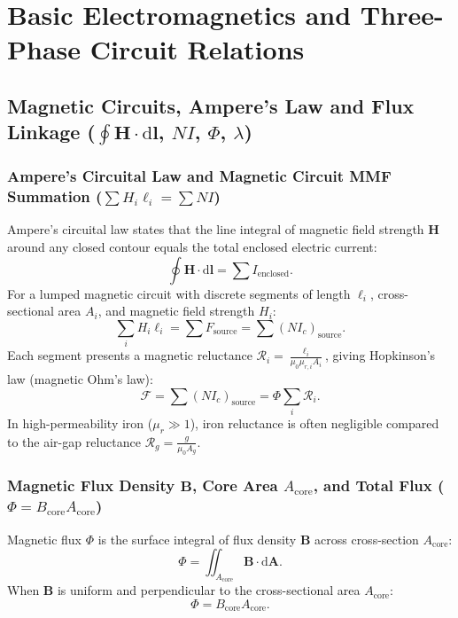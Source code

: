 \section{Basic Electromagnetics and Three-Phase Circuit Relations}

\subsection{Magnetic Circuits, Ampere's Law and Flux Linkage ($\oint \mathbf{H}\cdot\mathrm{d}\mathbf{l}$, $N I$, $\Phi$, $\lambda$)}

\subsubsection{Ampere's Circuital Law and Magnetic Circuit MMF Summation ($\sum H_i \ell_i = \sum N I$)}
Ampere's circuital law states that the line integral of magnetic field strength $\mathbf{H}$ around any closed contour equals the total enclosed electric current:
\[
\oint \mathbf{H}\cdot\mathrm{d}\mathbf{l} = \sum I_{\mathrm{enclosed}}.
\]
For a lumped magnetic circuit with discrete segments of length $\ell_i$, cross-sectional area $A_i$, and magnetic field strength $H_i$:
\[
\sum_i H_i\ell_i = \sum F_{\mathrm{source}} = \sum (N I_c)_{\mathrm{source}}.
\]
Each segment presents a magnetic reluctance $\mathcal{R}_i = \frac{\ell_i}{\mu_0 \mu_{r,i} A_i}$, giving Hopkinson's law (magnetic Ohm's law):
\[
\mathcal{F} = \sum (N I_c)_{\mathrm{source}} = \Phi \sum_i \mathcal{R}_i.
\]
In high-permeability iron ($\mu_r \gg 1$), iron reluctance is often negligible compared to the air-gap reluctance $\mathcal{R}_g = \frac{g}{\mu_0 A_g}$.

\subsubsection{Magnetic Flux Density $\mathbf{B}$, Core Area $A_{\mathrm{core}}$, and Total Flux ($\Phi = B_{\mathrm{core}} A_{\mathrm{core}}$)}
Magnetic flux $\Phi$ is the surface integral of flux density $\mathbf{B}$ across cross-section $A_{\mathrm{core}}$:
\[
\Phi = \iint_{A_{\mathrm{core}}} \mathbf{B}\cdot\mathrm{d}\mathbf{A}.
\]
When $\mathbf{B}$ is uniform and perpendicular to the cross-sectional area $A_{\mathrm{core}}$:
\[
\Phi = B_{\mathrm{core}} A_{\mathrm{core}}.
\]

